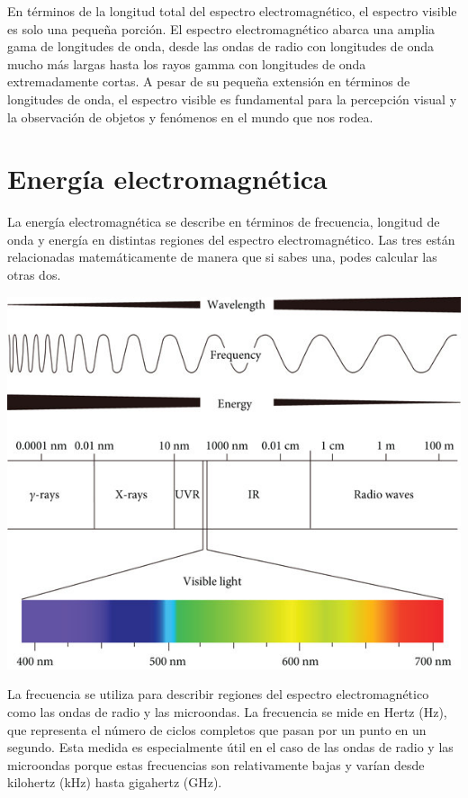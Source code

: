 \documentclass[a4paper,12pt]{article}
\newenvironment{Figure}
  {\par\medskip\noindent\minipage{\linewidth}}
  {\endminipage\par\medskip}
\begin{document}
\begin{multicols*}{2}
En términos de la longitud total del espectro electromagnético, el espectro visible es solo una pequeña porción. El espectro electromagnético abarca una amplia gama de longitudes de onda, desde las ondas de radio con longitudes de onda mucho más largas hasta los rayos gamma con longitudes de onda extremadamente cortas. A pesar de su pequeña extensión en términos de longitudes de onda, el espectro visible es fundamental para la percepción visual y la observación de objetos y fenómenos en el mundo que nos rodea.

\section*{Energía electromagnética}

La energía electromagnética se describe en términos de frecuencia, longitud de onda y energía en distintas regiones del espectro electromagnético. Las tres están relacionadas matemáticamente de manera que si sabes una, podes calcular las otras dos.

\begin{Figure}
    \centering
    \includegraphics[width=1\linewidth]{WaveFreqEnergy.jpg}
    \label{fig: WaveFreqEnergy}
\end{Figure}

La frecuencia se utiliza para describir regiones del espectro electromagnético como las ondas de radio y las microondas. La frecuencia se mide en Hertz (Hz), que representa el número de ciclos completos que pasan por un punto en un segundo. Esta medida es especialmente útil en el caso de las ondas de radio y las microondas porque estas frecuencias son relativamente bajas y varían desde kilohertz (kHz) hasta gigahertz (GHz). %


\end{multicols*}
\end{document}
